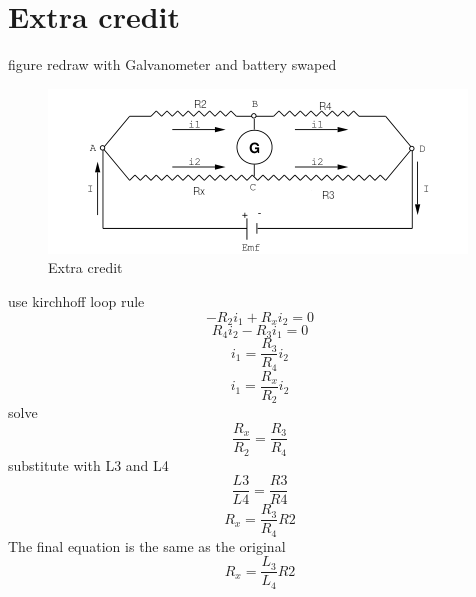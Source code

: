 \documentclass[11pt,letterpaper]{article}
\begin{document}
\section*{Extra credit}
figure redraw with Galvanometer and battery swaped
\begin{figure}[H]
    \centering
    \includegraphics[width=\textwidth]{labDiagramEC}
    \caption{Extra credit}
    \label{fig:Extra credit}
\end{figure}
use kirchhoff loop rule
\begin{equation}
-R_2 i_1 + R_x i_2 = 0
\end{equation}
\begin{equation}
R_4 i_2 - R_3 i_1 = 0
\end{equation}
\begin{equation}
i_1 = \frac{R_3}{R_4}i_2
\end{equation}
\begin{equation}
i_1 = \frac{R_x}{R_2}i_2
\end{equation}
solve
\begin{equation}
\frac{R_x}{R_2} = \frac{R_3}{R_4}
\end{equation}
substitute with L3 and L4
\begin{equation}
    \frac{L3}{L4} = \frac{R3}{R4}
\end{equation}
\begin{equation}
    R_x = \frac{R_3}{R_4}R2
\end{equation}
The final equation is the same as the original
\begin{equation}
    R_x = \frac{L_3}{L_4}R2
\end{equation}
\end{document}
